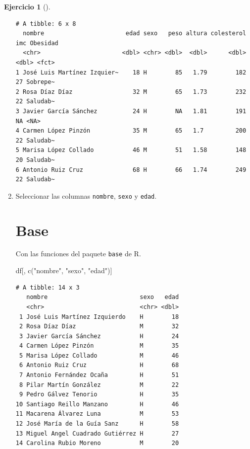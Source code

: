 \documentclass[
  a4paper,
]{scrreport}
\newenvironment{Shaded}{\begin{snugshade}}{\end{snugshade}}
\newcommand{\FunctionTok}[1]{\textcolor[rgb]{0.28,0.35,0.67}{#1}}
\newcommand{\NormalTok}[1]{\textcolor[rgb]{0.00,0.23,0.31}{#1}}
\newcommand{\StringTok}[1]{\textcolor[rgb]{0.13,0.47,0.30}{#1}}
\theoremstyle{definition}
\newtheorem{exercise}{Ejercicio}[chapter]
\theoremstyle{remark}
\begin{document}
\begin{exercise}[]
\begin{enumerate}
\begin{tcolorbox}
\begin{verbatim}
# A tibble: 6 x 8
  nombre                       edad sexo   peso altura colesterol   imc Obesidad
  <chr>                       <dbl> <chr> <dbl>  <dbl>      <dbl> <dbl> <fct>   
1 José Luis Martínez Izquier~    18 H        85   1.79        182    27 Sobrepe~
2 Rosa Díaz Díaz                 32 M        65   1.73        232    22 Saludab~
3 Javier García Sánchez          24 H        NA   1.81        191    NA <NA>    
4 Carmen López Pinzón            35 M        65   1.7         200    22 Saludab~
5 Marisa López Collado           46 M        51   1.58        148    20 Saludab~
6 Antonio Ruiz Cruz              68 H        66   1.74        249    22 Saludab~
\end{verbatim}

  \end{tcolorbox}
\item
  Seleccionar las columnas \texttt{nombre}, \texttt{sexo} y
  \texttt{edad}.

  \begin{tcolorbox}[enhanced jigsaw, breakable, toptitle=1mm, colbacktitle=quarto-callout-tip-color!10!white, rightrule=.15mm, opacityback=0, opacitybacktitle=0.6, titlerule=0mm, coltitle=black, colframe=quarto-callout-tip-color-frame, colback=white, bottomtitle=1mm, leftrule=.75mm, toprule=.15mm, title=\textcolor{quarto-callout-tip-color}{\faLightbulb}\hspace{0.5em}{Solución}, arc=.35mm, bottomrule=.15mm, left=2mm]

  \section{Base}

  Con las funciones del paquete \texttt{base} de R.

\begin{Shaded}
\begin{Highlighting}[]
\NormalTok{df[, }\FunctionTok{c}\NormalTok{(}\StringTok{"nombre"}\NormalTok{, }\StringTok{"sexo"}\NormalTok{, }\StringTok{"edad"}\NormalTok{)]}
\end{Highlighting}
\end{Shaded}

\begin{verbatim}
# A tibble: 14 x 3
   nombre                          sexo   edad
   <chr>                           <chr> <dbl>
 1 José Luis Martínez Izquierdo    H        18
 2 Rosa Díaz Díaz                  M        32
 3 Javier García Sánchez           H        24
 4 Carmen López Pinzón             M        35
 5 Marisa López Collado            M        46
 6 Antonio Ruiz Cruz               H        68
 7 Antonio Fernández Ocaña         H        51
 8 Pilar Martín González           M        22
 9 Pedro Gálvez Tenorio            H        35
10 Santiago Reillo Manzano         H        46
11 Macarena Álvarez Luna           M        53
12 José María de la Guía Sanz      H        58
13 Miguel Angel Cuadrado Gutiérrez H        27
14 Carolina Rubio Moreno           M        20
\end{verbatim}


\end{tcolorbox}
\end{enumerate}
\end{exercise}
\end{document}

